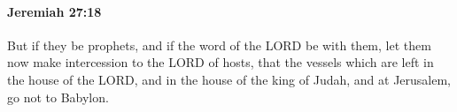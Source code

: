 
		\paragraph{Jeremiah 27:18} %
			\label{JEREMIAH-27-18}

			But if they be prophets, and if the word of the LORD be with them, let them now make intercession to the LORD of hosts, that the vessels which are left in the house of the LORD, and in the house of the king of Judah, and at Jerusalem, go not to Babylon.


